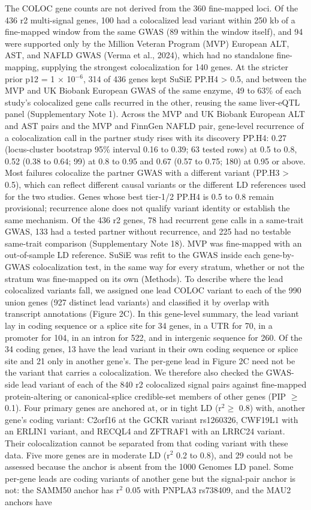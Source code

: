 The COLOC gene counts are not derived from the 360 fine-mapped loci. Of the 436 r2 multi-signal genes, 100 had a colocalized lead variant within 250 kb of a fine-mapped window from the same GWAS (89 within the window itself), and 94 were supported only by the Million Veteran Program (MVP) European ALT, AST, and NAFLD GWAS (Verma et al., 2024), which had no standalone fine-mapping, supplying the strongest colocalization for 140 genes. At the stricter prior p12 = 1 $\times$ 10$^{-6}$, 314 of 436 genes kept SuSiE PP.H4 \textgreater{} 0.5, and between the MVP and UK Biobank European GWAS of the same enzyme, 49 to 63\% of each study's colocalized gene calls recurred in the other, reusing the same liver-eQTL panel (Supplementary Note 1). Across the MVP and UK Biobank European ALT and AST pairs and the MVP and FinnGen NAFLD pair, gene-level recurrence of a colocalization call in the partner study rises with its discovery PP.H4: 0.27 (locus-cluster bootstrap 95\% interval 0.16 to 0.39; 63 tested rows) at 0.5 to 0.8, 0.52 (0.38 to 0.64; 99) at 0.8 to 0.95 and 0.67 (0.57 to 0.75; 180) at 0.95 or above. Most failures colocalize the partner GWAS with a different variant (PP.H3 \textgreater{} 0.5), which can reflect different causal variants or the different LD references used for the two studies. Genes whose best tier-1/2 PP.H4 is 0.5 to 0.8 remain provisional; recurrence alone does not qualify variant identity or establish the same mechanism. Of the 436 r2 genes, 78 had recurrent gene calls in a same-trait GWAS, 133 had a tested partner without recurrence, and 225 had no testable same-trait comparison (Supplementary Note 18). MVP was fine-mapped with an out-of-sample LD reference. SuSiE was refit to the GWAS inside each gene-by-GWAS colocalization test, in the same way for every stratum, whether or not the stratum was fine-mapped on its own (Methods). To describe where the lead colocalized variants fall, we assigned one lead COLOC variant to each of the 990 union genes (927 distinct lead variants) and classified it by overlap with transcript annotations (Figure 2C). In this gene-level summary, the lead variant lay in coding sequence or a splice site for 34 genes, in a UTR for 70, in a promoter for 104, in an intron for 522, and in intergenic sequence for 260. Of the 34 coding genes, 13 have the lead variant in their own coding sequence or splice site and 21 only in another gene's. The per-gene lead in Figure 2C need not be the variant that carries a colocalization. We therefore also checked the GWAS-side lead variant of each of the 840 r2 colocalized signal pairs against fine-mapped protein-altering or canonical-splice credible-set members of other genes (PIP $\ge$ 0.1). Four primary genes are anchored at, or in tight LD (r$^2 \ge$ 0.8) with, another gene's coding variant: C2orf16 at the GCKR variant rs1260326, CWF19L1 with an ERLIN1 variant, and RECQL4 and ZFTRAF1 with an LRRC24 variant. Their colocalization cannot be separated from that coding variant with these data. Five more genes are in moderate LD (r$^2$ 0.2 to 0.8), and 29 could not be assessed because the anchor is absent from the 1000 Genomes LD panel. Some per-gene leads are coding variants of another gene but the signal-pair anchor is not: the SAMM50 anchor has r$^2$ 0.05 with PNPLA3 rs738409, and the MAU2 anchors have 